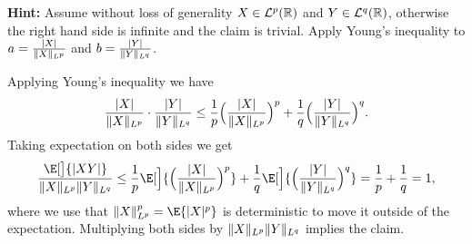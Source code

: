 \begin{exercise}
\begin{enumerate}[label=(\alph*)]
        \textbf{Hint:} 
        Assume without loss of generality \(X \in \mathcal{L}^p(\mathbb{R})\) and \(Y\in \mathcal{L}^q(\mathbb{R})\),
        otherwise the right hand side is infinite and the claim is trivial.
        Apply Young's inequality to \(a =
        \frac{\lvert X\rvert}{\lVert X\rVert_{L^p}}\) and \(b = \frac{\lvert Y\rvert}{\lVert Y\rVert_{L^q}}\).
        \begin{solution}
            Applying Young's inequality we have
            \[
                \frac{\lvert X\rvert}{\lVert X\rVert_{L^p}} \cdot \frac{\lvert Y\rvert}{\lVert Y\rVert_{L^q}}
                \le \frac1p \Bigl(\frac{\lvert X\rvert}{\lVert X\rVert_{L^p}}\Bigr)^p
                + \frac1q \Bigl(\frac{\lvert Y\rvert}{\lVert Y\rVert_{L^q}}\Bigr)^q.
            \]
            Taking expectation on both sides we get
            \[
                \frac{\E[\big]{\abs{XY}}}{\norm{X}_{L^p} \norm{Y}_{L^q}}
                \le 
                    \frac1p \E[\Big]{\Bigl(\frac{\abs{X}}{\norm{X}_{L^p}}\Bigr)^p}
                    + \frac1q \E[\Big]{\Bigl(\frac{\abs{Y}}{\norm{Y}_{L^q}}\Bigr)^q}
                = 
                    \frac1p + \frac1q
                = 1,
            \]
            where we use that \(\norm{X}_{L^p}^p = \E{\abs{X}^p}\) is
            deterministic to move it outside of the expectation. Multiplying
            both sides by \(\lVert X\rVert_{L^p} \lVert Y\rVert_{L^q}\)
            implies the claim.
        \end{solution}
    \end{enumerate}
\end{exercise}

